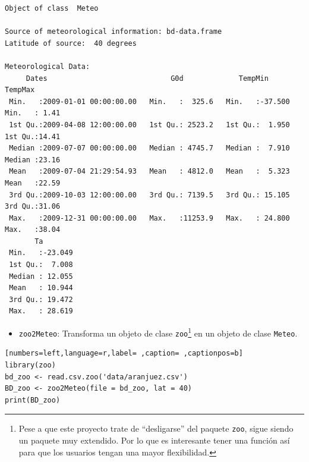 \begin{verbatim}
Object of class  Meteo 

Source of meteorological information: bd-data.frame 
Latitude of source:  40 degrees

Meteorological Data:
     Dates                             G0d             TempMin           TempMax     
 Min.   :2009-01-01 00:00:00.00   Min.   :  325.6   Min.   :-37.500   Min.   : 1.41  
 1st Qu.:2009-04-08 12:00:00.00   1st Qu.: 2523.2   1st Qu.:  1.950   1st Qu.:14.41  
 Median :2009-07-07 00:00:00.00   Median : 4745.7   Median :  7.910   Median :23.16  
 Mean   :2009-07-04 21:29:54.93   Mean   : 4812.0   Mean   :  5.323   Mean   :22.59  
 3rd Qu.:2009-10-03 12:00:00.00   3rd Qu.: 7139.5   3rd Qu.: 15.105   3rd Qu.:31.06  
 Max.   :2009-12-31 00:00:00.00   Max.   :11253.9   Max.   : 24.800   Max.   :38.04  
       Ta         
 Min.   :-23.049  
 1st Qu.:  7.008  
 Median : 12.055  
 Mean   : 10.944  
 3rd Qu.: 19.472  
 Max.   : 28.619
\end{verbatim}

\begin{itemize}
\item \texttt{zoo2Meteo}: Transforma un objeto de clase \texttt{zoo}\footnote{Pese a que este proyecto trate de ``desligarse'' del paquete \texttt{zoo}, sigue siendo un paquete muy extendido. Por lo que es interesante tener una función así para que los usuarios tengan una mayor flexibilidad.} en un objeto de clase \texttt{Meteo}.
\end{itemize}
\begin{lstlisting}[numbers=left,language=r,label= ,caption= ,captionpos=b]
library(zoo)
bd_zoo <- read.csv.zoo('data/aranjuez.csv')
BD_zoo <- zoo2Meteo(file = bd_zoo, lat = 40)
print(BD_zoo)
\end{lstlisting}

